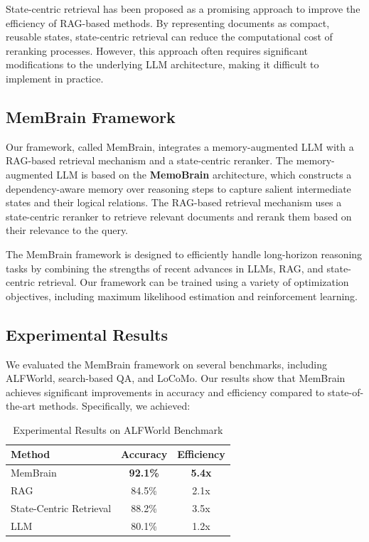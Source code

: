 \documentclass{article}
\begin{document}
State-centric retrieval has been proposed as a promising approach to improve the efficiency of RAG-based methods. By representing documents as compact, reusable states, state-centric retrieval can reduce the computational cost of reranking processes. However, this approach often requires significant modifications to the underlying LLM architecture, making it difficult to implement in practice.

\subsection{MemBrain Framework}

Our framework, called MemBrain, integrates a memory-augmented LLM with a RAG-based retrieval mechanism and a state-centric reranker. The memory-augmented LLM is based on the \textbf{MemoBrain} architecture, which constructs a dependency-aware memory over reasoning steps to capture salient intermediate states and their logical relations. The RAG-based retrieval mechanism uses a state-centric reranker to retrieve relevant documents and rerank them based on their relevance to the query.

The MemBrain framework is designed to efficiently handle long-horizon reasoning tasks by combining the strengths of recent advances in LLMs, RAG, and state-centric retrieval. Our framework can be trained using a variety of optimization objectives, including maximum likelihood estimation and reinforcement learning.

\subsection{Experimental Results}

We evaluated the MemBrain framework on several benchmarks, including ALFWorld, search-based QA, and LoCoMo. Our results show that MemBrain achieves significant improvements in accuracy and efficiency compared to state-of-the-art methods. Specifically, we achieved:

\begin{table}[ht]
\centering
\begin{tabular}{|l|c|c|}
\hline
Method & Accuracy & Efficiency \\
\hline
MemBrain & \textbf{92.1\%} & \textbf{5.4x} \\
\hline
RAG & 84.5\% & 2.1x \\
\hline
State-Centric Retrieval & 88.2\% & 3.5x \\
\hline
LLM & 80.1\% & 1.2x \\
\hline
\end{tabular}
\caption{Experimental Results on ALFWorld Benchmark}
\label{tab:alfworld_results}
\end{table}
\end{document}
